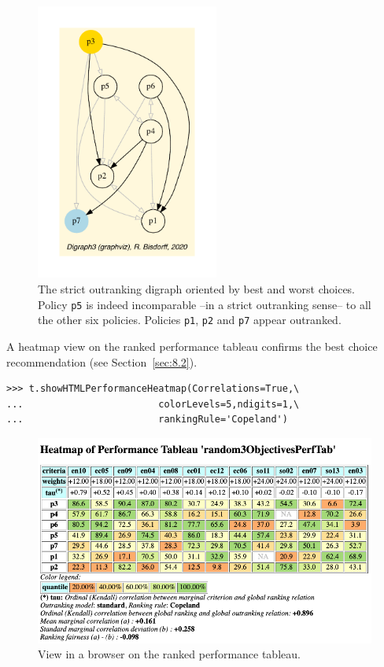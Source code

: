\begin{figure}[h]
\sidecaption[t]
\includegraphics[width=6cm]{Figures/3ObjPerfTabBestChoice.pdf}
\caption{The strict outranking digraph oriented by best and worst choices. Policy \texttt{p5} is indeed incomparable --in a strict  outranking sense-- to all the other six policies. Policies \texttt{p1}, \texttt{p2} and \texttt{p7} appear outranked.}
\label{fig:6.4}       %
\end{figure}

A heatmap view on the \Copeland ranked performance tableau confirms the best choice recommendation (see Section~\ref{sec:8.2}).
\begin{lstlisting}
>>> t.showHTMLPerformanceHeatmap(Correlations=True,\
...                        colorLevels=5,ndigits=1,\
...                        rankingRule='Copeland')
\end{lstlisting}
\begin{figure}[h]
\includegraphics[width=12cm]{Figures/random3ObjHeatmap.png}
\caption{View in a browser on the \Copeland ranked performance tableau.}
\label{fig:6.5}       %
\end{figure}
\clearpage
